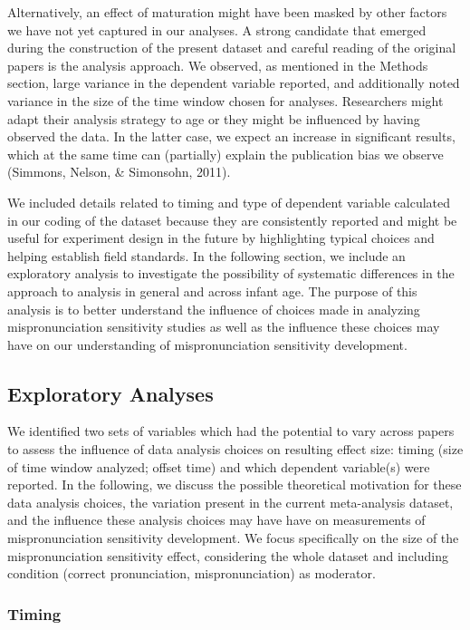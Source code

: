 \documentclass[man]{apa6}
\theoremstyle{definition}
\theoremstyle{definition}
\theoremstyle{definition}
\theoremstyle{remark}
\begin{document}
Alternatively, an effect of maturation might have been masked by other
factors we have not yet captured in our analyses. A strong candidate
that emerged during the construction of the present dataset and careful
reading of the original papers is the analysis approach. We observed, as
mentioned in the Methods section, large variance in the dependent
variable reported, and additionally noted variance in the size of the
time window chosen for analyses. Researchers might adapt their analysis
strategy to age or they might be influenced by having observed the data.
In the latter case, we expect an increase in significant results, which
at the same time can (partially) explain the publication bias we observe
(Simmons, Nelson, \& Simonsohn, 2011).

We included details related to timing and type of dependent variable
calculated in our coding of the dataset because they are consistently
reported and might be useful for experiment design in the future by
highlighting typical choices and helping establish field standards. In
the following section, we include an exploratory analysis to investigate
the possibility of systematic differences in the approach to analysis in
general and across infant age. The purpose of this analysis is to better
understand the influence of choices made in analyzing mispronunciation
sensitivity studies as well as the influence these choices may have on
our understanding of mispronunciation sensitivity development.

\subsection{Exploratory Analyses}\label{exploratory-analyses}

We identified two sets of variables which had the potential to vary
across papers to assess the influence of data analysis choices on
resulting effect size: timing (size of time window analyzed; offset
time) and which dependent variable(s) were reported. In the following,
we discuss the possible theoretical motivation for these data analysis
choices, the variation present in the current meta-analysis dataset, and
the influence these analysis choices may have have on measurements of
mispronunciation sensitivity development. We focus specifically on the
size of the mispronunciation sensitivity effect, considering the whole
dataset and including condition (correct pronunciation,
mispronunciation) as moderator.

\subsubsection{Timing}\label{timing}
\end{document}

